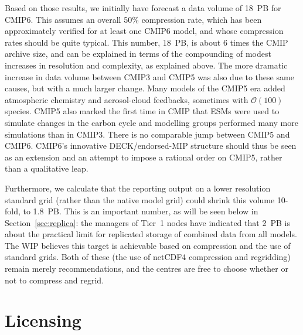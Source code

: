 \documentclass[gmd,manuscript]{copernicus}
\newcommand{\secref}[1] {\mbox{Section  \ref{sec:#1}}}
\begin{document}
Based on those results, we initially have forecast a data volume of
18~PB for CMIP6. This assumes an overall 50\% compression rate, which
has been approximately verified for at least one CMIP6 model, and
whose compression rates should be quite typical. This number, 18~PB,
is about 6 times the CMIP archive size, and can be explained in terms
of the compounding of modest increases in resolution and complexity,
as explained above. The more dramatic increase in data volume between
CMIP3 and CMIP5 was also due to these same causes, but with a much
larger change. Many models of the CMIP5 era added atmospheric chemistry
and aerosol-cloud feedbacks, sometimes with $\mathcal{O}(100)$
species. CMIP5 also marked the first time in CMIP that ESMs were used to
simulate changes in the carbon cycle and modelling groups performed
many more simulations than in CMIP3. There is no comparable jump 
between CMIP5 and CMIP6. CMIP6's innovative DECK/endorsed-MIP structure 
should thus be seen as an extension and an attempt to impose a rational 
order on CMIP5, rather than a qualitative leap.

Furthermore, we calculate that the reporting output on a lower
resolution standard grid (rather than the native model grid) could
shrink this volume 10-fold, to 1.8~PB. This is an important number, as
will be seen below in \secref{replica}: the managers of Tier~1 nodes
have indicated that 2~PB is about the practical limit for replicated
storage of combined data from all models. The WIP believes
this target is achievable based on compression and the use of standard
grids. Both of these (the use of netCDF4 compression and regridding)
remain merely recommendations, and the centres are free to choose
whether or not to compress and regrid.

\section{Licensing}
\label{sec:licensing}
\end{document}
